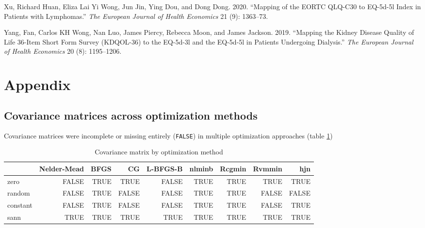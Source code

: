 \documentclass[
]{article}
\newlength{\cslhangindent}
\newenvironment{CSLReferences}[2] %
 {%
  \setlength{\parindent}{0pt}
  \ifodd #1 \everypar{\setlength{\hangindent}{\cslhangindent}}\ignorespaces\fi
  \ifnum #2 > 0
  \setlength{\parskip}{#2\baselineskip}
  \fi
 }%
 {}
\begin{document}
\begin{CSLReferences}{1}{0}
\leavevmode{}%
Xu, Richard Huan, Eliza Lai Yi Wong, Jun Jin, Ying Dou, and Dong Dong. 2020. {``Mapping of the EORTC QLQ-C30 to EQ-5d-5l Index in Patients with Lymphomas.''} \emph{The European Journal of Health Economics} 21 (9): 1363--73.

\leavevmode{}%
Yang, Fan, Carlos KH Wong, Nan Luo, James Piercy, Rebecca Moon, and James Jackson. 2019. {``Mapping the Kidney Disease Quality of Life 36-Item Short Form Survey (KDQOL-36) to the EQ-5d-3l and the EQ-5d-5l in Patients Undergoing Dialysis.''} \emph{The European Journal of Health Economics} 20 (8): 1195--1206.

\end{CSLReferences}

\newpage

\hypertarget{appendix}{%
\section{Appendix}\label{appendix}}

\hypertarget{covariance-matrices-across-optimization-methods}{%
\subsection{Covariance matrices across optimization methods}\label{covariance-matrices-across-optimization-methods}}

Covariance matrices were incomplete or missing entirely (\texttt{FALSE}) in multiple optimization approaches (table \ref{tab:cov})

\begin{table}[ht]
\centering
\caption{Covariance matrix by optimization method} 
\label{tab:cov}
\begin{tabular}{lrrrrrrrr}
  \hline
 & Nelder-Mead & BFGS & CG & L-BFGS-B & nlminb & Rcgmin & Rvmmin & hjn \\ 
  \hline
zero & FALSE & TRUE & TRUE & FALSE & TRUE & TRUE & TRUE & TRUE \\ 
  random & FALSE & TRUE & FALSE & FALSE & TRUE & TRUE & FALSE & FALSE \\ 
  constant & FALSE & TRUE & FALSE & FALSE & TRUE & TRUE & FALSE & TRUE \\ 
  sann & TRUE & TRUE & TRUE & TRUE & TRUE & TRUE & TRUE & TRUE \\ 
   \hline
\end{tabular}
\end{table}
\end{document}
